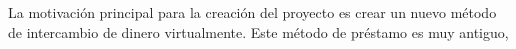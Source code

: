 \documentclass[a4paper, 12pt]{book}
\begin{document}
La motivación principal para la creación del proyecto es crear un nuevo método 
de intercambio de dinero virtualmente. Este método de préstamo es muy antiguo, 
\end{document}
